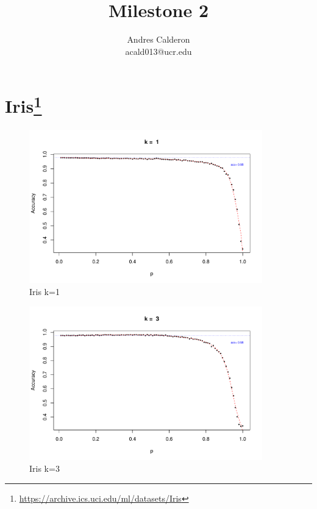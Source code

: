 \documentclass{article}
\title{Milestone 2}
\author{Andres Calderon \\ acald013@ucr.edu}
\begin{document}
\maketitle

\section[Iris]{Iris\footnote{\url{https://archive.ics.uci.edu/ml/datasets/Iris}}}

\begin{figure}[h!]
 \centering
 \includegraphics[width=0.9\textwidth]{./figures/Iris_k1.pdf}
 \caption{Iris k=1}
 \label{fig:iris1}
\end{figure}
\begin{figure}[h!]
 \centering
 \includegraphics[width=0.9\textwidth]{./figures/Iris_k3.pdf}
 \caption{Iris k=3}
 \label{fig:iris3}
\end{figure}
\end{document}
